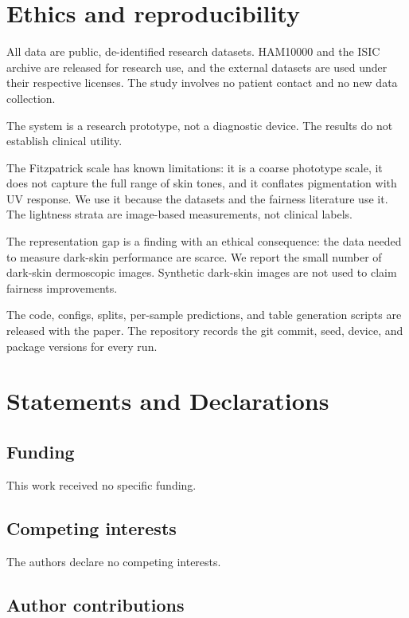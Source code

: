 \section{Ethics and reproducibility}

All data are public, de-identified research datasets. HAM10000 and the ISIC archive are released for research use, and the external datasets are used under their respective licenses. The study involves no patient contact and no new data collection.

The system is a research prototype, not a diagnostic device. The results do not establish clinical utility.

The Fitzpatrick scale has known limitations: it is a coarse phototype scale, it does not capture the full range of skin tones, and it conflates pigmentation with UV response. We use it because the datasets and the fairness literature use it. The lightness strata are image-based measurements, not clinical labels.

The representation gap is a finding with an ethical consequence: the data needed to measure dark-skin performance are scarce. We report the small number of dark-skin dermoscopic images. Synthetic dark-skin images are not used to claim fairness improvements.

The code, configs, splits, per-sample predictions, and table generation scripts are released with the paper. The repository records the git commit, seed, device, and package versions for every run.

\section*{Statements and Declarations}

\subsection*{Funding}

This work received no specific funding.

\subsection*{Competing interests}

The authors declare no competing interests.

\ifdefined\blindmode
\subsection*{Author contributions}

